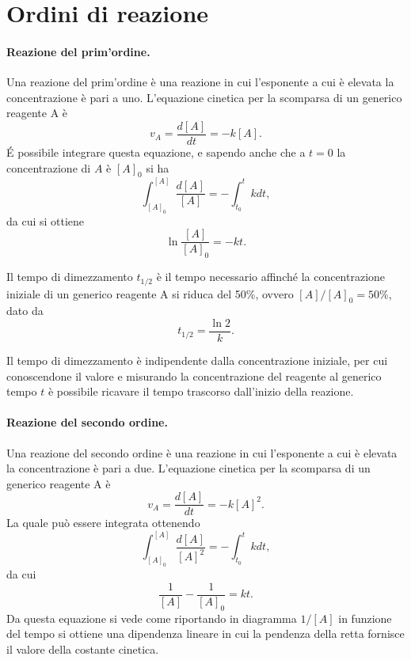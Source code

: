 \section{Ordini di reazione}
\paragraph{Reazione del prim'ordine.} Una reazione del prim'ordine è una reazione in cui l'esponente a cui è elevata la concentrazione è pari a uno. L'equazione cinetica per la scomparsa di un generico reagente A è
\begin{equation}
    v_A=\frac{d[A]}{dt}=-k[A].
\end{equation}
\'E possibile integrare questa equazione, e sapendo anche che a $t=0$ la concentrazione di $A$ è $[A]_0$ si ha
\begin{equation}
    \int_{[A]_0}^{[A]}\frac{d[A]}{[A]}=-\int_{t_0}^tkdt,
\end{equation}
da cui si ottiene
\begin{equation}
    \ln{\frac{[A]}{[A]_0}}=-kt.
\end{equation}
\begin{defn}
    Il tempo di dimezzamento $t_{1/2}$ è il tempo necessario affinché la concentrazione iniziale di un generico reagente A si riduca del 50\%, ovvero $[A]/[A]_0=50\%$, dato da
    \begin{equation}
        t_{1/2}=\frac{\ln{2}}{k}.
    \end{equation}
\end{defn}
\begin{obs}
    Il tempo di dimezzamento è indipendente dalla concentrazione iniziale, per cui conoscendone il valore e misurando la concentrazione del reagente al generico tempo $t$ è possibile ricavare il tempo trascorso dall'inizio della reazione.
\end{obs}

\paragraph{Reazione del secondo ordine.} Una reazione del secondo ordine è una reazione in cui l'esponente a cui è elevata la concentrazione è pari a due. L'equazione cinetica per la scomparsa di un generico reagente A è
\begin{equation}
    v_A=\frac{d[A]}{dt}=-k[A]^2.
\end{equation}
La quale può essere integrata ottenendo
\begin{equation}
    \int_{[A]_0}^{[A]}\frac{d[A]}{[A]^2}=-\int_{t_0}^tkdt,
\end{equation}
da cui
\begin{equation}
    \frac{1}{[A]}-\frac{1}{[A]_0}=kt.
\end{equation}
Da questa equazione si vede come riportando in diagramma $1/[A]$ in funzione del tempo si ottiene una dipendenza lineare in cui la pendenza della retta fornisce il valore della costante cinetica.